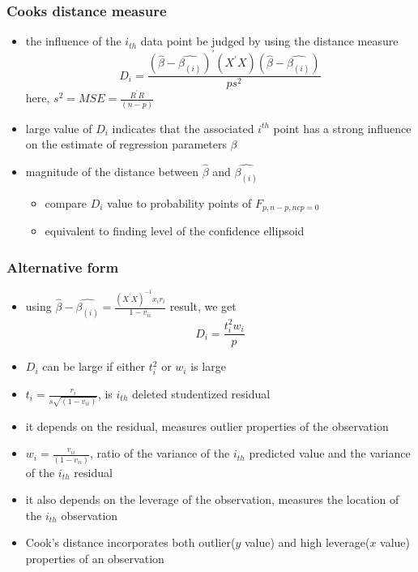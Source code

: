 \documentclass[
	11pt, %
]{beamer}
\begin{document}
\begin{frame}
	\frametitle{Cooks distance measure}
	\begin{itemize}
		\item the influence of the $i_{th}$	data point be judged by using the distance measure
		\begin{equation}
			D_i=\frac{(\hat{\beta}-\hat{\beta_{(i)}})^{'}(X^{'}X)(\hat{\beta}-\hat{\beta_{(i)}})}{ps^2}
		\end{equation}
		here, $s^2=MSE=\frac{R^{'}R}{(n-p)}$
		\item large value of $D_i$ indicates that the associated $i^{th}$ point has a strong influence on the estimate of regression parameters $\beta$
		\item magnitude of the distance between $\hat{\beta}$ and $\hat{\beta_{(i)}}$
		\begin{itemize}
				\item compare $D_i$ value to probability points of $F_{p,n-p,ncp=0}$
				\item equivalent to finding level of the confidence ellipsoid
		\end{itemize}
	\end{itemize}
\end{frame}
	
\begin{frame}
	\frametitle{Alternative form}
	\begin{itemize}
		\item using $\hat{\beta}-\hat{\beta_{(i)}}=\frac{(X^{'}X)^{-1}x_ir_i}{1-v_{ii}}$ result, we get 
		\begin{equation*}
			D_i=\frac{t_i^2w_i}{p}
		\end{equation*}
		\item $D_i$ can be large if either $t_i^2$ or $w_i$ is large
		\item $t_i=\frac{r_i}{s\sqrt{(1-v_{ii})}}$, is $i_{th}$ deleted studentized residual
		\item it depends on the residual, measures outlier properties of the observation
		\item $w_i=\frac{v_{ii}}{(1-v_{ii})}$, ratio of the variance of the
		$i_{th}$ predicted value and the variance of the $i_{th}$ residual
		\item it also depends on the leverage of the observation, measures the location of the $i_{th}$ observation
		\item Cook's distance incorporates both outlier($y$ value) and high leverage($x$ value) properties of an observation
	\end{itemize}
\end{frame}
\end{document}
